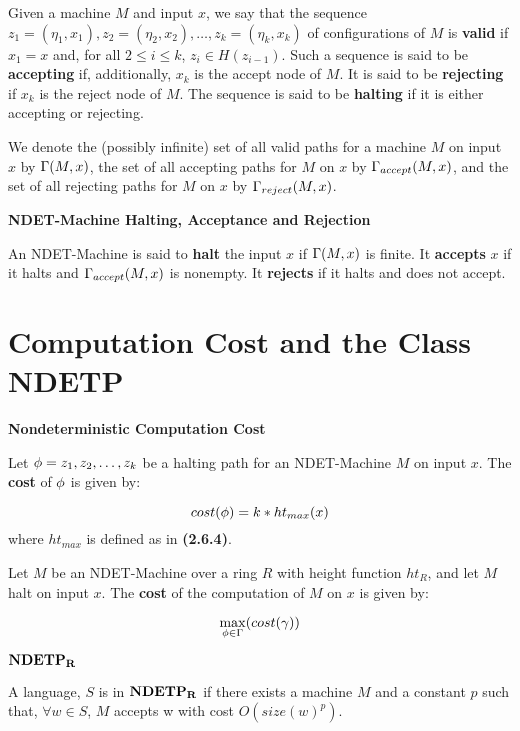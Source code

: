Given a machine $M$ and input $x$, we say that the sequence $z_1 =
(\eta_1, x_1), z_2 = (\eta_2, x_2), \ldots, z_k = (\eta_k, x_k)$ of
configurations of $M$ is \textbf{valid} if $x_1 = x$ and, for all $2
\leq i \leq k$, $z_i \in H(z_{i-1})$.  Such a sequence is said to be
\textbf{accepting} if, additionally, $x_k$ is the accept node of $M$.
It is said to be \textbf{rejecting} if $x_k$ is the reject node of
$M$.  The sequence is said to be \textbf{halting} if it is either
accepting or rejecting.

We denote the (possibly infinite) set of all valid paths for a machine
$M$ on input $x$ by $\Gamma(M, x)$, the set of all accepting paths
for $M$ on $x$ by $\Gamma_{accept}(M, x)$, and the set of all rejecting paths 
for $M$ on $x$ by $\Gamma_{reject}(M, x)$.

\begin{definition} \textbf{NDET-Machine Halting, Acceptance and Rejection}

  An NDET-Machine is said to \textbf{halt} the input $x$ if
  $\Gamma(M, x)$ is finite.  It \textbf{accepts} $x$ if it halts
  and $\Gamma_{accept}(M, x)$ is nonempty.  It \textbf{rejects} if it halts
  and does not accept.
  
\end{definition}

\section{Computation Cost and the Class NDETP}

\begin{definition} \textbf{Nondeterministic Computation Cost}

  Let $\phi = z_1, z_2, \ldots, z_k$ be a halting path for an
  NDET-Machine $M$ on input $x$.  The \textbf{cost} of $\phi$ is
  given by:

  $$cost(\phi) = k*ht_{max}(x)$$ where $ht_{max}$ is defined as in 
  \textbf{(2.6.4)}.

  Let $M$ be an NDET-Machine over a ring $R$ with height function
  $ht_R$, and let $M$ halt on input $x$.  The \textbf{cost} of the
  computation of $M$ on $x$ is given by:
  
  $$\max_{\phi \in \Gamma}(cost(\gamma))$$

\end{definition}

\begin{definition} $\mathbf{NDETP_R}$
  
  A language, $S$ is in $\mathbf{NDETP_R}$ if there exists a machine $M$ and a
  constant $p$ such that, $\forall w \in S$, $M$ accepts w with cost
  $O(size(w)^p)$.
\end{definition}

